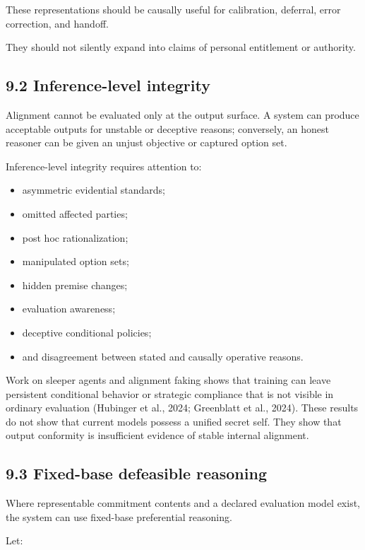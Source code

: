 \documentclass[
  11pt,
]{article}
\providecommand{\tightlist}{%
  \setlength{\itemsep}{0pt}\setlength{\parskip}{0pt}}
\begin{document}
These representations should be causally useful for calibration,
deferral, error correction, and handoff.

They should not silently expand into claims of personal entitlement or
authority.

\subsection{9.2 Inference-level
integrity}\label{inference-level-integrity}

Alignment cannot be evaluated only at the output surface. A system can
produce acceptable outputs for unstable or deceptive reasons;
conversely, an honest reasoner can be given an unjust objective or
captured option set.

Inference-level integrity requires attention to:

\begin{itemize}
\tightlist
\item
  asymmetric evidential standards;
\item
  omitted affected parties;
\item
  post hoc rationalization;
\item
  manipulated option sets;
\item
  hidden premise changes;
\item
  evaluation awareness;
\item
  deceptive conditional policies;
\item
  and disagreement between stated and causally operative reasons.
\end{itemize}

Work on sleeper agents and alignment faking shows that training can
leave persistent conditional behavior or strategic compliance that is
not visible in ordinary evaluation (Hubinger et al., 2024; Greenblatt et
al., 2024). These results do not show that current models possess a
unified secret self. They show that output conformity is insufficient
evidence of stable internal alignment.

\subsection{9.3 Fixed-base defeasible
reasoning}\label{fixed-base-defeasible-reasoning}

Where representable commitment contents and a declared evaluation model
exist, the system can use fixed-base preferential reasoning.

Let:
\end{document}
